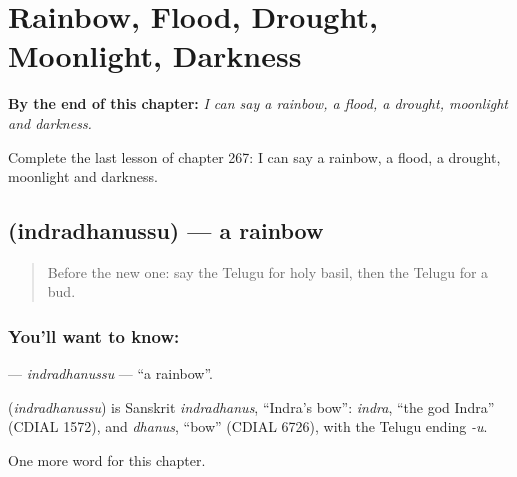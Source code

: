 
\chapter{Rainbow, Flood, Drought, Moonlight, Darkness}
\label{ch:te-rainbow-flood-drought-moonlight-darkness}

\begin{chapteropening}
\textbf{By the end of this chapter:} \emph{I can say a rainbow, a flood, a drought, moonlight and darkness.}

Complete the last lesson of chapter 267: I can say a rainbow, a flood, a drought, moonlight and darkness.
\end{chapteropening}

\section[\texorpdfstring{\te{ఇంద్రధనుస్సు} (indradhanussu)}{ఇంద్రధనుస్సు (indradhanussu)}]{ (indradhanussu) — a rainbow}

\label{lesson:TE-C267-indradhanussu}



\begin{quote}
Before the new one: say the Telugu for holy basil, then the Telugu for a bud.
\end{quote}

\subsection*{You'll want to know: }
\textbf{} — \emph{indradhanussu} — \textquotedblleft{}a rainbow\textquotedblright{}.

\begin{cousinweb}
\textbf{} (\emph{indradhanussu}) is Sanskrit \emph{indradhanus}, \textquotedblleft{}Indra's bow\textquotedblright{}: \emph{indra}, \textquotedblleft{}the god Indra\textquotedblright{} (CDIAL 1572), and \emph{dhanus}, \textquotedblleft{}bow\textquotedblright{} (CDIAL 6726), with the Telugu ending \emph{-u}.
\end{cousinweb}

\begin{grammarlens}[title={What you've built}]
One more word for this chapter.
\end{grammarlens}

